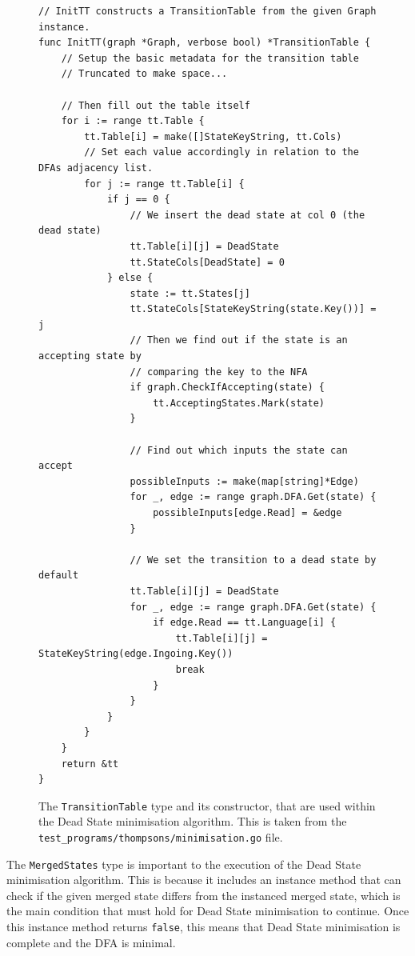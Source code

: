 \documentclass[]{full}
\theoremstyle{definition}
\begin{document}
\begin{figure}[H]\ContinuedFloat
    \begin{verbatim}
// InitTT constructs a TransitionTable from the given Graph instance.
func InitTT(graph *Graph, verbose bool) *TransitionTable {
    // Setup the basic metadata for the transition table
    // Truncated to make space...

    // Then fill out the table itself
    for i := range tt.Table {
        tt.Table[i] = make([]StateKeyString, tt.Cols)
        // Set each value accordingly in relation to the DFAs adjacency list.
        for j := range tt.Table[i] {
            if j == 0 {
                // We insert the dead state at col 0 (the dead state)
                tt.Table[i][j] = DeadState
                tt.StateCols[DeadState] = 0
            } else {
                state := tt.States[j]
                tt.StateCols[StateKeyString(state.Key())] = j
                // Then we find out if the state is an accepting state by
                // comparing the key to the NFA
                if graph.CheckIfAccepting(state) {
                    tt.AcceptingStates.Mark(state)
                }

                // Find out which inputs the state can accept
                possibleInputs := make(map[string]*Edge)
                for _, edge := range graph.DFA.Get(state) {
                    possibleInputs[edge.Read] = &edge
                }

                // We set the transition to a dead state by default
                tt.Table[i][j] = DeadState
                for _, edge := range graph.DFA.Get(state) {
                    if edge.Read == tt.Language[i] {
                        tt.Table[i][j] = StateKeyString(edge.Ingoing.Key())
                        break
                    }
                }
            }
        }
    }
    return &tt
}
    \end{verbatim}
    \cprotect\caption{The \verb|TransitionTable| type and its constructor, that are used within the Dead State minimisation algorithm. This is taken from the \verb|test_programs/thompsons/minimisation.go| file.}
\end{figure}

The \verb|MergedStates| type is important to the execution of the Dead State minimisation algorithm. This is because it includes an instance method that can check if the given merged state differs from the instanced merged state, which is the main condition that must hold for Dead State minimisation to continue. Once this instance method returns \verb|false|, this means that Dead State minimisation is complete and the DFA is minimal.
\end{document}
